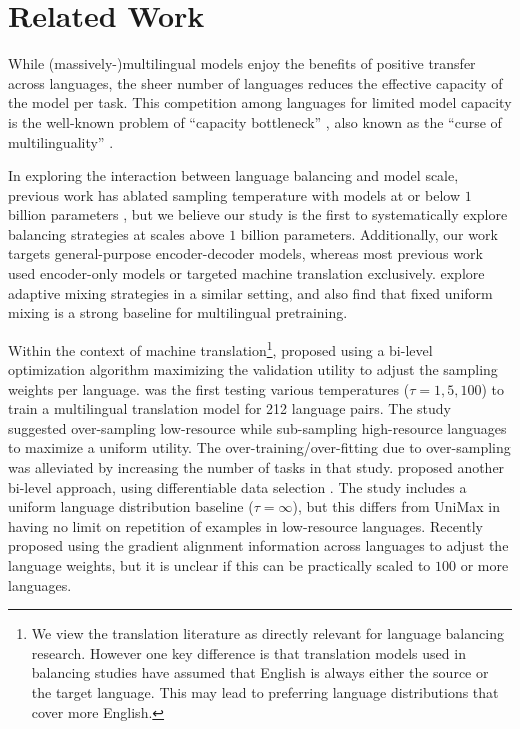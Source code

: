 \documentclass{article} %
\begin{document}
\section{Related Work}

While (massively-)multilingual models enjoy the benefits of positive transfer across languages, the sheer number of languages reduces the effective capacity of the model per task. This competition among languages for limited model capacity is the well-known problem of ``capacity bottleneck'' \citep{DBLP:journals/corr/abs-1907-05019}, also known as the ``curse of multilinguality'' \citep{conneau-etal-2020-unsupervised}. 

In exploring the interaction between language balancing and model scale, previous work has ablated sampling temperature with models at or below $1$ billion parameters \citep{conneau-etal-2020-unsupervised, xue-etal-2021-mt5}, but we believe our study is the first to systematically explore balancing strategies at scales above $1$ billion parameters. Additionally, our work targets general-purpose encoder-decoder models, whereas most previous work used encoder-only models or targeted machine translation exclusively. \citet{michel2021balancing} explore adaptive mixing strategies in a similar setting, and also find that fixed uniform mixing is a strong baseline for multilingual pretraining.

Within the context of machine translation\footnote{We view the translation literature as directly relevant for language balancing research. However one key difference is that translation models used in balancing studies have assumed that English is always either the source or the target language. This may lead to preferring language distributions that cover more English.}, \citet{jean2019adaptive} proposed using a bi-level optimization algorithm maximizing the validation utility to adjust the sampling weights per language. \citet{DBLP:journals/corr/abs-1907-05019} was the first testing various temperatures ($\tau=1,5,100$) to train a multilingual translation model for 212 language pairs. The study suggested over-sampling low-resource while sub-sampling high-resource languages to maximize a uniform utility. The over-training/over-fitting due to over-sampling was alleviated by increasing the number of tasks in that study. \citet{wang-etal-2020-balancing} proposed another bi-level approach, using differentiable data selection \citep{wang2020optimizing}. The study includes a uniform language distribution baseline ($\tau=\infty$), but this differs from UniMax in having no limit on repetition of examples in low-resource languages. Recently \citet{ wang2021gradient} proposed using the gradient alignment information across languages to adjust the language weights, but it is unclear if this can be practically scaled to $100$ or more languages.
\end{document}
